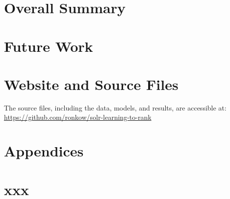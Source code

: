 \documentclass[11pt]{report}
\begin{document}
\section{Overall Summary}



\section{Future Work}



\section{Website and Source Files}

The source files, including the data, models, and results, are accessible at:\\ 
\indent \url{https://github.com/ronkow/solr-learning-to-rank}








\pagebreak
{}
{}
\section*{\Huge{Appendices}}

\renewcommand{\thesection}{\Alph{section}}
\appendix

\section{xxx}\label{appendix:schema}
\end{document}
